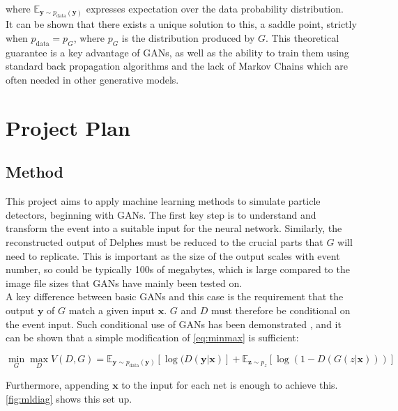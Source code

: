 \documentclass{article}
\begin{document}
where  $\mathbb{E}_{\mathbf{y}\sim p_{\text{data}}(\mathbf{y})}$ expresses expectation over the data probability distribution.  \\

It can be shown that there exists a unique solution to this, a saddle point, strictly when $p_{\text{data}} = p_G$, where $p_G$ is the distribution produced by $G$. This theoretical guarantee is a key advantage of GANs, as well as the ability to train them using standard back propagation algorithms and the lack of Markov Chains which are often needed in other generative models.   



\section{Project Plan}
\label{sec:plan}


\subsection{Method}
This project aims to apply machine learning methods to simulate particle detectors, beginning with GANs. The first key step is to understand and transform the event into a suitable input for the neural network. Similarly, the reconstructed output of Delphes must be reduced to the crucial parts that $G$ will need to replicate. This is important as the size of the output scales with event number, so could be typically 100s of megabytes, which is large compared to the image file sizes that GANs have mainly been tested on.\\

A key difference between basic GANs and this case is the requirement that the output $\mathbf{y}$ of $G$ match a given input $\mathbf{x}$. $G$ and $D$ must therefore be conditional on the event input. Such conditional use of GANs has been demonstrated \cite{mirza2014conditional}, and it can be shown that a simple modification of \cref{eq:minmax} is sufficient:

\[
 \min_{G}\max_{D}V(D,G) = \mathbb{E}_{\mathbf{y}\sim p_{\text{data}}(\mathbf{y})} [\log(D(\mathbf{y|x})] + \mathbb{E}_{\mathbf{z}\sim p_{z}} [\log(1-D(G(z|\mathbf{x})))] 
\]

Furthermore, appending $\mathbf{x}$ to the input for each net is enough to achieve this. \cref{fig:mldiag} shows this set up.
\end{document}
